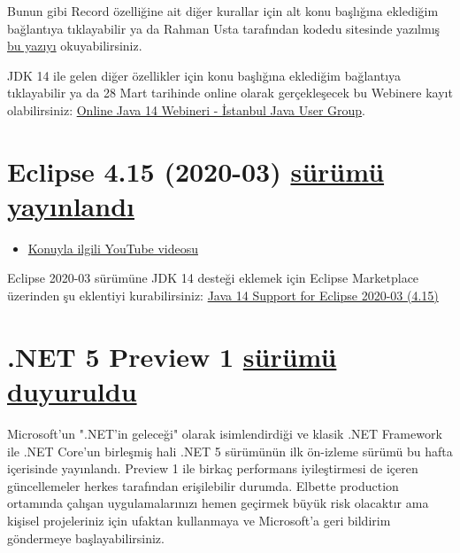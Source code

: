 \documentclass[11pt]{article}
\begin{document}
Bunun gibi Record özelliğine ait diğer kurallar için alt konu başlığına
eklediğim bağlantıya tıklayabilir ya da Rahman Usta tarafından kodedu
sitesinde yazılmış \href{https://kodedu.com/2020/01/javada-recordlar/}{bu yazıyı} okuyabilirsiniz.

JDK 14 ile gelen diğer özellikler için konu başlığına eklediğim bağlantıya
tıklayabilir ya da 28 Mart tarihinde online olarak gerçekleşecek bu Webinere
kayıt olabilirsiniz: \href{https://istanbul-jug.org/2020/03/online-java-14-webineri/}{Online Java 14 Webineri - İstanbul Java User Group}.
\section{Eclipse 4.15 (2020-03) \href{https://www.eclipse.org/eclipse/news/4.15/}{sürümü yayınlandı}}
\label{sec:org4ac702e}
\begin{itemize}
\item \href{https://www.youtube.com/watch?v=XoUvOTiVaDc}{Konuyla ilgili YouTube videosu}
\end{itemize}

Eclipse 2020-03 sürümüne JDK 14 desteği eklemek için Eclipse Marketplace
üzerinden şu eklentiyi kurabilirsiniz: \href{https://marketplace.eclipse.org/content/java-14-support-eclipse-2020-03-415}{Java 14 Support for Eclipse 2020-03
(4.15)}
\section{.NET 5 Preview 1 \href{https://devblogs.microsoft.com/dotnet/announcing-net-5-0-preview-1/}{sürümü duyuruldu}}
\label{sec:org963410a}
Microsoft'un ".NET'in geleceği" olarak isimlendirdiği ve klasik .NET Framework
ile .NET Core'un birleşmiş hali .NET 5 sürümünün ilk ön-izleme sürümü bu hafta
içerisinde yayınlandı. Preview 1 ile birkaç performans iyileştirmesi de içeren
güncellemeler herkes tarafından erişilebilir durumda. Elbette production
ortamında çalışan uygulamalarınızı hemen geçirmek büyük risk olacaktır ama
kişisel projeleriniz için ufaktan kullanmaya ve Microsoft'a geri bildirim
göndermeye başlayabilirsiniz.
\end{document}
